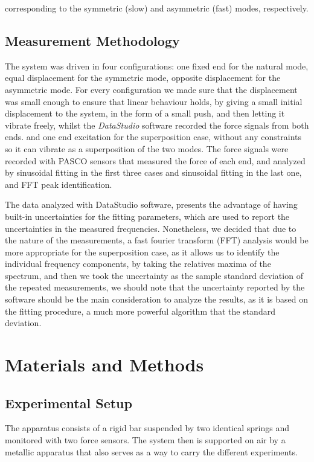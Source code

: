 \documentclass[a4paper,11pt]{article}
\begin{document}
corresponding to the symmetric (slow) and asymmetric (fast) modes, respectively.



\subsection{Measurement Methodology}
The system was driven in four configurations: one fixed end for the natural mode, equal displacement 
for the symmetric mode, opposite displacement for the asymmetric mode.
For every configuration we made sure that the displacement was small enough to ensure that linear behaviour holds,
by giving a small initial displacement to the system, in the form of a small push, and then letting it vibrate freely, 
whilst the \textit{DataStudio} software recorded the force signals from both ends. 
and one end excitation for the superposition case, without any constraints so it can vibrate as a superposition of the two modes.
The force signals were recorded with PASCO sensors that measured the force of each end, and analyzed by sinusoidal fitting in the first three cases and sinusoidal fitting in the last one, and FFT peak identification.



The data analyzed with DataStudio software, presents the advantage of having built-in uncertainties for the fitting parameters, 
which are used to report the uncertainties in the measured frequencies.
Nonetheless, we decided that due to the nature of the measurements, a fast fourier transform (FFT) analysis would be more appropriate for the superposition case, as it allows us to identify the individual frequency components,
by taking the relatives maxima of the spectrum, and then we took the uncertainty as the sample standard deviation of the repeated measurements, we should note that the uncertainty reported by the software
should be the main consideration to analyze the results, as it is based on the fitting procedure, a much more powerful algorithm that the standard deviation.





\section{Materials and Methods}

\subsection{Experimental Setup}
The apparatus consists of a rigid bar suspended by two identical springs and monitored with two force sensors.
The system then is supported on air by a metallic apparatus that also serves as a way to carry the different experiments.
\end{document}
